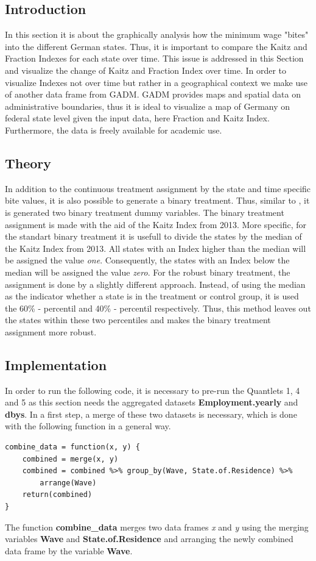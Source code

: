 \documentclass[a4paper]{article}
\begin{document}
{\subsection{Introduction}
In this section it is about the graphically analysis how the minimum wage "bites" into the different German states. Thus, it is important to compare the Kaitz and Fraction Indexes for each state over time. This issue is addressed in this Section and visualize the change of Kaitz and Fraction Index over time. In order to visualize Indexes not over time but rather in a geographical context we make use of another data frame from GADM. GADM provides maps and spatial data on administrative boundaries, thus it is ideal to visualize a map of Germany on federal state level given the input data, here Fraction and Kaitz Index. Furthermore, the data is freely available for academic use.

\subsection{Theory}
In addition to the continuous treatment assignment by the state and time specific bite values, it is also possible to generate a binary treatment. Thus, similar to \cite{schmitz2017effects}, it is generated two binary treatment dummy variables. The binary treatment assignment is made with the aid of the Kaitz Index from 2013. More specific, for the standart binary treatment it is usefull to divide the states by the median of the Kaitz Index from 2013. All states with an Index higher than the median will be assigned the value \textit{one}. Consequently, the states with an Index below the median will be assigned the value \textit{zero}. For the robust binary treatment, the assignment is done by a slightly different approach. Instead, of using the median as the indicator whether a state is in the treatment or control group, it is used the 60\% - percentil and 40\% - percentil respectively. Thus, this method leaves out the states within these two percentiles and makes the binary treatment assignment more robust.

\subsection{Implementation}
In order to run the following code, it is necessary to pre-run the Quantlets 1, 4 and 5 as this section needs the aggregated datasets \textbf{Employment.yearly} and \textbf{dbys}. In a first step, a merge of these two datasets is necessary, which is done with the following function in a general way.
\begin{lstlisting}
combine_data = function(x, y) {
    combined = merge(x, y)
    combined = combined %>% group_by(Wave, State.of.Residence) %>% 
    	arrange(Wave)
    return(combined)
}
\end{lstlisting}
The function \textbf{combine\_data} merges two data frames \textit{x} and \textit{y} using the merging variables \textbf{Wave} and \textbf{State.of.Residence} and arranging the newly combined data frame by the variable \textbf{Wave}.

}
\end{document}
